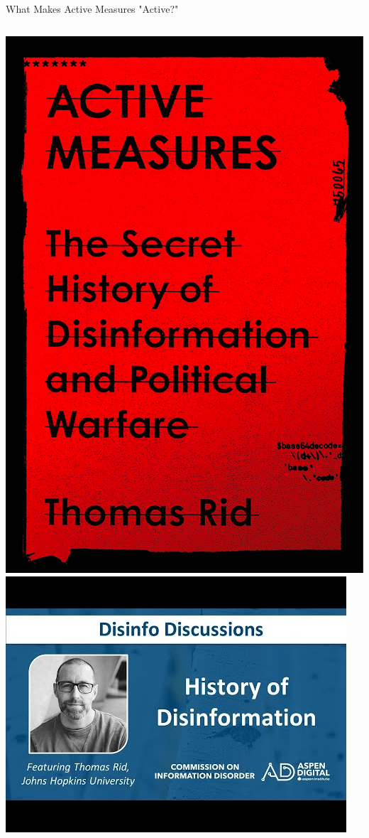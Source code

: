\documentclass[nobackground,dvipsnames,table,aspectratio=169]{beamer}
\begin{document}
\begin{frame}{What Makes Active Measures "Active?"}
    \begin{columns}
            \includegraphics[width=\textwidth]{active-measures}
            \href{https://youtu.be/tnyKgVpLcAM}{\includegraphics[width=\textwidth]{active-measures-vid}}
    \end{columns}
\end{frame}
\end{document}

